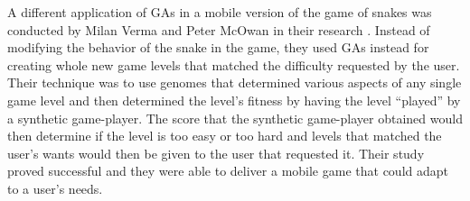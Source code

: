 	A different application of GAs in a mobile version of the game of snakes was conducted by Milan Verma and Peter McOwan in their research \cite{Verma05}. Instead of modifying the behavior of the 
	snake in the game, they used GAs instead for creating whole new game levels that matched the difficulty requested by the user. Their technique was to use genomes that determined various 
	aspects of any single game level and then determined the level's fitness by having the level “played” by a synthetic game-player. The score that the synthetic game-player obtained would then determine 
	if the level is too easy or too hard and levels that matched the user's wants would then be given to the user that requested it. Their study proved successful and they were able to deliver a 
	mobile game that could adapt to a user's needs.